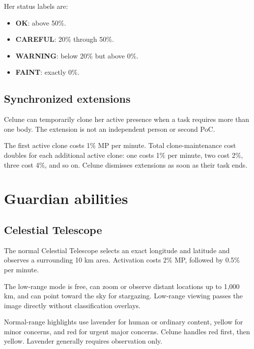 \documentclass[10pt]{article}
\providecommand{\tightlist}{\setlength{\itemsep}{0pt}\setlength{\parskip}{0pt}}
\begin{document}
Her status labels are:

\begin{itemize}
\tightlist
\item
  \textbf{OK}: above 50\%.
\item
  \textbf{CAREFUL}: 20\% through 50\%.
\item
  \textbf{WARNING}: below 20\% but above 0\%.
\item
  \textbf{FAINT}: exactly 0\%.
\end{itemize}

\hypertarget{synchronized-extensions}{%
\subsection{Synchronized extensions}\label{synchronized-extensions}}

Celune can temporarily clone her active presence when a task requires more than one body. The extension is not an independent person or second PoC.

The first active clone costs 1\% MP per minute. Total clone-maintenance cost doubles for each additional active clone: one costs 1\% per minute, two cost 2\%, three cost 4\%, and so on. Celune dismisses extensions as soon as their task ends.

\hypertarget{guardian-abilities}{%
\section{Guardian abilities}\label{guardian-abilities}}

\hypertarget{celestial-telescope}{%
\subsection{Celestial Telescope}\label{celestial-telescope}}

The normal Celestial Telescope selects an exact longitude and latitude and observes a surrounding 10 km area. Activation costs 2\% MP, followed by 0.5\% per minute.

The low-range mode is free, can zoom or observe distant locations up to 1,000 km, and can point toward the sky for stargazing. Low-range viewing passes the image directly without classification overlays.

Normal-range highlights use lavender for human or ordinary content, yellow for minor concerns, and red for urgent major concerns. Celune handles red first, then yellow. Lavender generally requires observation only.
\end{document}
